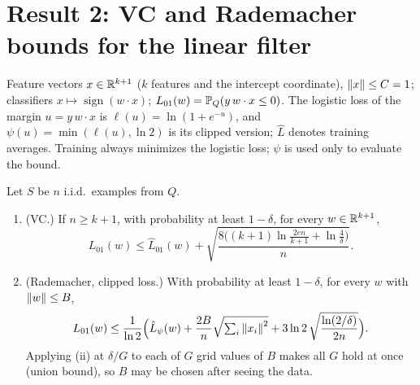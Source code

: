 \section{Result 2: VC and Rademacher bounds for the linear filter}
\label{sec:result-2}

Feature vectors $x\in\R^{k+1}$ ($k$ features and the intercept coordinate), $\norm{x}\le C=1$;
classifiers $x\mapsto\operatorname{sign}(w\cdot x)$; $L_{01}(w)=\P_Q(y\,w\cdot x\le0)$. The
logistic loss of the margin $u=y\,w\cdot x$ is $\ell(u)=\ln(1+e^{-u})$, and
$\psi(u)=\min(\ell(u),\ln2)$ is its clipped version; $\hat L$ denotes training averages. Training
always minimizes the logistic loss; $\psi$ is used only to evaluate the bound.

\begin{theorem}[Result 2]
\label{thm:2}
Let $S$ be $n$ i.i.d.\ examples from $Q$.
\begin{enumerate}[label=(\roman*)]
  \item (VC.) If $n\ge k+1$, with probability at least $1-\delta$, for every $w\in\R^{k+1}$,
  \[ L_{01}(w)\le\hat L_{01}(w)+\sqrt{\frac{8\bigl((k+1)\ln\frac{2en}{k+1}+\ln\frac4\delta\bigr)}{n}}. \]
  \item (Rademacher, clipped loss.) With probability at least $1-\delta$, for every $w$ with
  $\norm{w}\le B$,
  \[ L_{01}(w)\le\frac1{\ln2}\Bigl(\hat L_{\psi}(w)+\frac{2B}{n}\sqrt{\textstyle\sum_{i}\norm{x_i}^2}
     +3\ln2\,\sqrt{\frac{\ln(2/\delta)}{2n}}\Bigr). \]
  Applying (ii) at $\delta/G$ to each of $G$ grid values of $B$ makes all $G$ hold at once (union
  bound), so $B$ may be chosen after seeing the data.
\end{enumerate}
\end{theorem}

